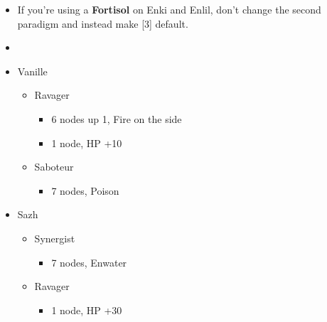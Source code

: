 \begin{menu}
  \begin{multicols}{2}
    \begin{itemize}
      \paradigm
      \begin{itemize}
      \item If you're using a \textbf{Fortisol} on Enki and Enlil, don't change the second paradigm and instead make [3] default.
        \item {}%
              {\paradigmline{\rav}{\com}{}}%
              {\paradigmline[2]{\textit{(\sab)}}{\textit{(\syn)}}{}}%
              {\paradigmline{\sab}{\syn}{}}%
              {\paradigmline{\rav}{\rav}{}}%
              {\paradigmline{[\sab]}{(\rav)}{}}%
              {\paradigmline{[\sab]}{\com}{}}
      \end{itemize}
      \columnbreak
      \crystarium
      \begin{itemize}
        \item Vanille
              \begin{itemize}
                \item Ravager
                      \begin{itemize}
                        \item 6 nodes up 1, Fire on the side
                        \item 1 node, HP +10
                      \end{itemize}
                \item Saboteur
                      \begin{itemize}
                        \item 7 nodes, Poison
                      \end{itemize}
              \end{itemize}
        \item Sazh
              \begin{itemize}
                \item Synergist
                      \begin{itemize}
                        \item 7 nodes, Enwater
                      \end{itemize}
                \item Ravager
                      \begin{itemize}
                        \item 1 node, HP +30
                      \end{itemize}

\end{itemize}
\end{itemize}
\end{itemize}
\end{multicols}
\end{menu}
